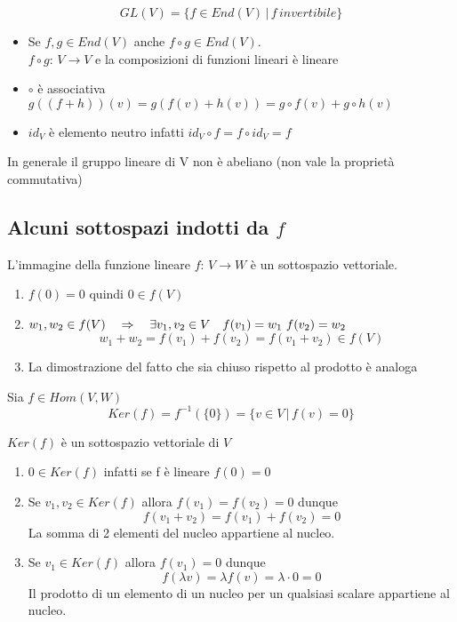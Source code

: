 \vspace{0.5 cm}

\begin{defn}\bianco
$$ GL(V)=\{ f \in End (V) \, | \, f \, invertibile \}$$
\begin{thm}\bianco
\proof \bbianco
\begin{itemize}
\item Se $f,g \in End(V)$ anche $ f\circ g \in End(V)$.\\
$f\circ g: \, V \to V $ e la composizioni di funzioni lineari è lineare
\item $ 	\circ $ è associativa $g((f+h))(v)=g(f(v)+h(v))= g\circ f(v)+g \circ h(v)$
\item $id_V $ è elemento neutro infatti $ id_V \circ f = f \circ id_V=f$
\end{itemize}
\endproof
\end{thm}
\begin{oss} In generale il gruppo lineare di V non è abeliano (non vale la proprietà commutativa)
\end{oss}
\end{defn}
\newpage

\subsection{Alcuni sottospazi indotti da $f$}
\begin{prop}[Immagine]\bianco
L'immagine della funzione lineare $f: \, V \to W $ è un sottospazio vettoriale.
\proof \bbianco
\begin{enumerate}
\item  $f(0)=0$ quindi $0 \in f(V) $
\item $w_1, w_2 \in f(V)\quad \Rightarrow \quad \exists v_1, v_2 \in V \quad f(v_1)=w_1 \, \,  f(v_2)=w_2$
$$w_1+w_2=f(v_1)+f(v_2)=f(v_1+v_2) \in f(V)$$
\item La dimostrazione del fatto che sia chiuso rispetto al prodotto è analoga
\end{enumerate}
\end{prop}
\spazio

\begin{defn}[Nucleo] \bianco
Sia $ f\in Hom(V,W) $
$$Ker (f)= f^{-1}(\{ 0 \})=\{  v \in V \, | \,  f(v)=0 \}$$
\end{defn}

\begin{prop}
$ Ker(f)$ è un sottospazio vettoriale di $V$
\proof \bbianco 
\begin{enumerate}
\item $ 0 \in Ker(f)$ infatti se f è lineare $f(0)=0$
\item Se  $v_1, v_2 \in Ker(f) $ allora $ f(v_1)=f(v_2)=0 $ dunque  $$f(v_1+v_2)=f(v_1)+f(v_2)=0$$ La somma di 2 elementi del nucleo appartiene al nucleo.
\item Se $v_1 \in Ker (f)$ allora $f(v_1)=0 $ dunque 
$$f(\lambda  v ) = \lambda f(v)=\lambda \cdot 0 = 0 $$ Il prodotto di un elemento di un nucleo per un qualsiasi scalare appartiene al nucleo.
\end{enumerate}
\endproof
\end{prop}


